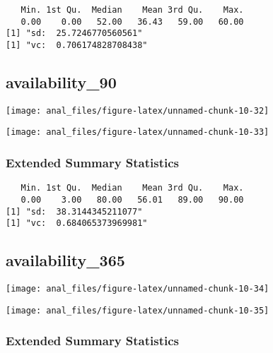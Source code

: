 \begin{verbatim}   Min. 1st Qu.  Median    Mean 3rd Qu.    Max. 
   0.00    0.00   52.00   36.43   59.00   60.00 
[1] "sd:  25.7246770560561"
[1] "vc:  0.706174828708438"
\end{verbatim}

\pagebreak

\hypertarget{availability_90}{%
\subsection{availability\_90}\label{availability_90}}

\begin{center}\texttt{[image: anal\_files/figure-latex/unnamed-chunk-10-32]} \end{center}

\begin{center}\texttt{[image: anal\_files/figure-latex/unnamed-chunk-10-33]} \end{center}

\hypertarget{extended-summary-statistics-9}{%
\subsubsection{Extended Summary
Statistics}\label{extended-summary-statistics-9}}

\begin{verbatim}   Min. 1st Qu.  Median    Mean 3rd Qu.    Max. 
   0.00    3.00   80.00   56.01   89.00   90.00 
[1] "sd:  38.3144345211077"
[1] "vc:  0.684065373969981"
\end{verbatim}

\pagebreak

\hypertarget{availability_365}{%
\subsection{availability\_365}\label{availability_365}}

\begin{center}\texttt{[image: anal\_files/figure-latex/unnamed-chunk-10-34]} \end{center}

\begin{center}\texttt{[image: anal\_files/figure-latex/unnamed-chunk-10-35]} \end{center}

\hypertarget{extended-summary-statistics-10}{%
\subsubsection{Extended Summary
Statistics}\label{extended-summary-statistics-10}}

